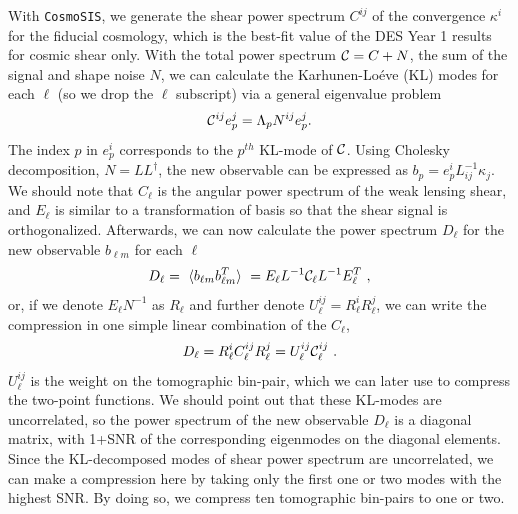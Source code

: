 \documentclass[twocolumn]{\docclass}
\newcommand\be{\begin{equation}}
\newcommand\ee{\end{equation}}
\begin{document}
	
	With  {\tt CosmoSIS}, we generate the shear power spectrum $C^{ij}$ of the convergence $\kappa^i$ for the fiducial cosmology, which is the best-fit value of the DES Year 1 results for cosmic shear only. With the total power spectrum $\mathcal{C}=C+N$, the sum of the signal and shape noise $N$, we can calculate the Karhunen-Lo\'eve (KL) modes for each $\ell$ (so we drop the $\ell$ subscript) via a general eigenvalue problem 
	\be
	\ctot^{ij} e^j_p = \Lambda_p N^{ij} e^j_p
	.\ee
	The index $p$ in $e_p^i$ corresponds to the $p^{th}$ KL-mode of $\mathcal{C}$. Using Cholesky decomposition, $N = L L^{\dagger}$, the new observable can be expressed as $b_p = e_p^i  L^{-1}_{ij} \kappa_{j}$. We should note that $C_{\ell}$ is the angular power spectrum of the weak lensing shear, and $E_{\ell}$ is similar to a transformation of basis so that the shear signal is orthogonalized. Afterwards, we can now calculate the power spectrum $D_{\ell}$ for the new observable $b_{\ell m}$ for each $\ell$
	\be
	D_{\ell} =\ \langle b_{\ell m} b_{\ell m}^T \rangle \ = E_{\ell} L^{-1} \ctot_{\ell} L^{-1} E^{T}_{\ell}\
	,\ee
	or, if we denote $E_{\ell} N^{-1}$ as $R_{\ell}$ and further denote $U_{\ell}^{ij}=R^i_{\ell} R^j_{\ell}$, we can write the compression in one simple linear combination of the $C_{\ell}$,
	\be
	D_{\ell} = R_{\ell}^i C_{\ell}^{ij} R_{\ell}^j = U_{\ell}^{ij} \ctot_{\ell}^{ij}\
	.\ee
	$U_{\ell}^{ij}$ is the weight on the tomographic bin-pair, which we can later use to compress the two-point functions. We should point out that these KL-modes are uncorrelated, so the power spectrum of the new observable $D_{\ell}$ is a diagonal matrix, with 1+SNR of the corresponding eigenmodes on the diagonal elements. Since the KL-decomposed modes of shear power spectrum are uncorrelated, we can make a compression here by taking only the first one or two modes with the highest SNR. By doing so, we compress ten tomographic bin-pairs to one or two.
	
\end{document}

